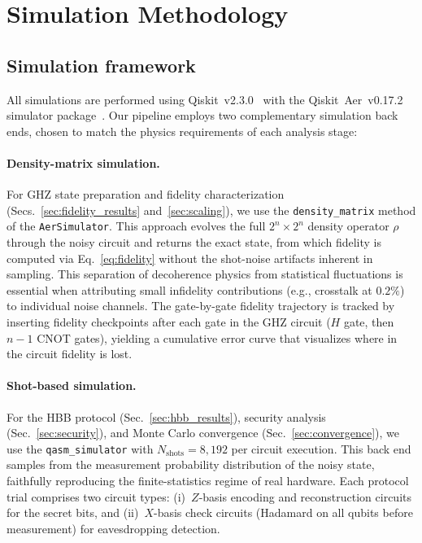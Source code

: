 \documentclass[aip, amsmath, amssymb, preprint, longbibliography]{revtex4-2}
\begin{document}
\section{Simulation Methodology}\label{sec:methods}

\subsection{Simulation framework}\label{sec:framework}

All simulations are performed using Qiskit~v2.3.0~\cite{Qiskit2024} with
the Qiskit~Aer~v0.17.2 simulator package~\cite{Aer2024}. Our pipeline
employs two complementary simulation back ends, chosen to match the
physics requirements of each analysis stage:

\paragraph{Density-matrix simulation.}
For GHZ state preparation and fidelity characterization
(Secs.~\ref{sec:fidelity_results} and~\ref{sec:scaling}), we use the
\texttt{density\_matrix} method of the \texttt{AerSimulator}. This
approach evolves the full $2^n\times2^n$ density operator $\rho$ through
the noisy circuit and returns the exact state, from which fidelity is
computed via Eq.~\eqref{eq:fidelity} without the shot-noise artifacts
inherent in sampling. This separation of decoherence physics from
statistical fluctuations is essential when attributing small infidelity
contributions (e.g., crosstalk at $0.2\%$) to individual noise channels.
The gate-by-gate fidelity trajectory is tracked by inserting fidelity
checkpoints after each gate in the GHZ circuit ($H$ gate, then $n-1$
CNOT gates), yielding a cumulative error curve that visualizes where in
the circuit fidelity is lost.

\paragraph{Shot-based simulation.}
For the HBB protocol (Sec.~\ref{sec:hbb_results}), security analysis
(Sec.~\ref{sec:security}), and Monte Carlo convergence
(Sec.~\ref{sec:convergence}), we use the \texttt{qasm\_simulator} with
$N_{\text{shots}}=8{,}192$ per circuit execution. This back end samples
from the measurement probability distribution of the noisy state,
faithfully reproducing the finite-statistics regime of real hardware.
Each protocol trial comprises two circuit types: (i)~$Z$-basis encoding
and reconstruction circuits for the secret bits, and (ii)~$X$-basis
check circuits (Hadamard on all qubits before measurement) for
eavesdropping detection.
\end{document}
